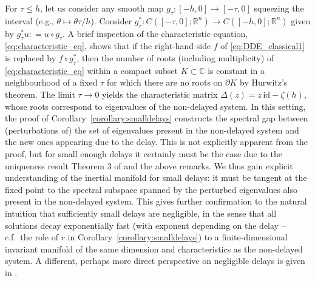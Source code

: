 \documentclass[a4paper, 12pt, oneside, reqno, notitlepage]{amsart}
\theoremstyle{plain}
\theoremstyle{definition}
\theoremstyle{remark}
\begin{document}
For $\tau \leq h$, let us consider any smooth map $g_\tau : [-h,0] \to [-\tau,0]$ squeezing the interval (e.g., $\theta \mapsto\theta \tau/h $).
Consider $g_\tau^*: C([-\tau,0];\mathbb{R}^n) \to C([-h,0];\mathbb{R}^n)$ given by $g^*_\tau u : = u \circ g_\tau$.
A brief inspection of the characteristic equation, \eqref{eq:characteristic_eq}, shows that if the right-hand side $f$ of \eqref{eq:DDE_classical1} is replaced by $f \circ g^*_\tau$, then the number of roots (including multiplicity) of \eqref{eq:characteristic_eq} within a compact subset $K \subset \mathbb{C}$ is constant in a neighbourhood of a fixed $\tau$ for which there are no roots on $\partial K$ by  Hurwitz's theorem.
The limit $\tau \to 0$ yields the characteristic matrix $\Delta(z) = z \, \mathrm{id} - \zeta(h)$, whose roots correspond to eigenvalues of the non-delayed system.
In this setting, the proof of Corollary~\ref{corollary:smalldelays} constructs the spectral gap between (perturbations of) the set of eigenvalues present in the non-delayed system and the new ones appearing due to the delay.
This is not explicitly apparent from the proof, but for small enough delays it certainly must be the case due to the uniqueness result Theorem 3 of \cite{driver1968ryabov} and the above remarks.
We thus gain explicit understanding of the inertial manifold for small delays: 
it must be tangent at the fixed point to the spectral subspace spanned by the perturbed eigenvalues also present in the non-delayed system. 
This gives further confirmation to the natural intuition that sufficiently small delays are negligible, in the sense that all solutions decay exponentially fast (with exponent depending on the delay -- c.f.\ the role of $r$ in Corollary~\ref{corollary:smalldelays}) to a finite-dimensional invariant manifold of the same dimension and characteristics as the non-delayed system. 
A different, perhaps more direct perspective on negligible delays is given in \cite{kurzweil2006small}.
\end{document}
